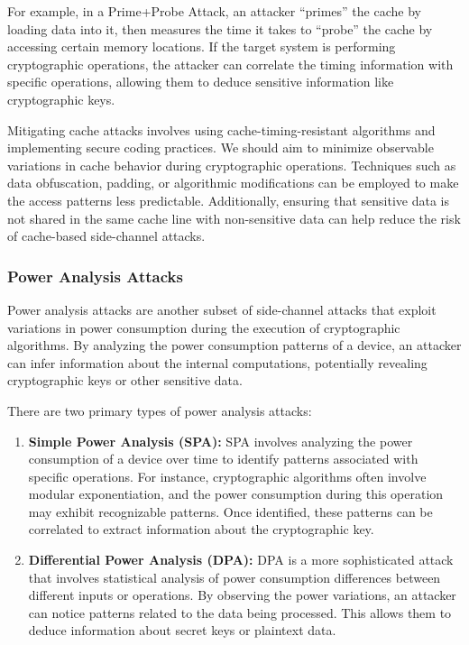 \documentclass[runningheads]{llncs}
\begin{document}
For example, in a Prime+Probe Attack, an attacker ``primes'' the cache by loading data into it, then measures the time it takes to ``probe'' the cache by accessing certain memory locations. If the target system is performing cryptographic operations, the attacker can correlate the timing information with specific operations, allowing them to deduce sensitive information like cryptographic keys.

Mitigating cache attacks involves using cache-timing-resistant algorithms and implementing secure coding practices. We should aim to minimize observable variations in cache behavior during cryptographic operations. Techniques such as data obfuscation, padding, or algorithmic modifications can be employed to make the access patterns less predictable. Additionally, ensuring that sensitive data is not shared in the same cache line with non-sensitive data can help reduce the risk of cache-based side-channel attacks.

\subsubsection{Power Analysis Attacks}

Power analysis attacks are another subset of side-channel attacks that exploit variations in power consumption during the execution of cryptographic algorithms. By analyzing the power consumption patterns of a device, an attacker can infer information about the internal computations, potentially revealing cryptographic keys or other sensitive data.

There are two primary types of power analysis attacks:

\begin{enumerate}
    \item \textbf{Simple Power Analysis (SPA):} SPA involves analyzing the power consumption of a device over time to identify patterns associated with specific operations. For instance, cryptographic algorithms often involve modular exponentiation, and the power consumption during this operation may exhibit recognizable patterns. Once identified, these patterns can be correlated to extract information about the cryptographic key.
    \item \textbf{Differential Power Analysis (DPA):} DPA is a more sophisticated attack that involves statistical analysis of power consumption differences between different inputs or operations. By observing the power variations, an attacker can notice patterns related to the data being processed. This allows them to deduce information about secret keys or plaintext data.

\end{enumerate}
\end{document}
